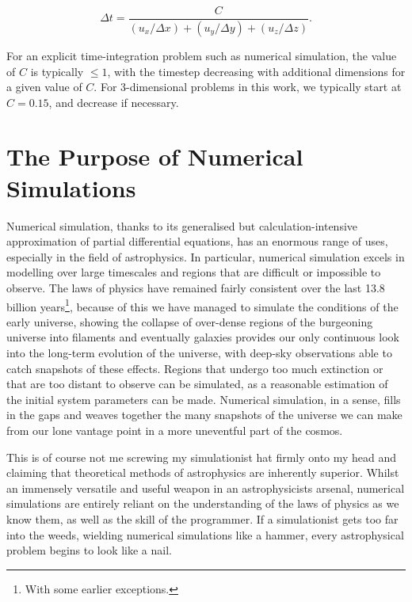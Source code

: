 \begin{equation}
  \Delta t = \frac{C}{(u_x/\Delta x) + (u_y/\Delta y) + (u_z/\Delta z)}.
\end{equation}

\noindent
For an explicit time-integration problem such as numerical simulation, the value of $C$ is typically $\leq 1$, with the timestep decreasing with additional dimensions for a given value of $C$.
For 3-dimensional problems in this work, we typically start at $C = 0.15$, and decrease if necessary.

\section{The Purpose of Numerical Simulations}
\label{sec:numerical-purpose}

Numerical simulation, thanks to its generalised but calculation-intensive approximation of partial differential equations, has an enormous range of uses, especially in the field of astrophysics.
In particular, numerical simulation excels in modelling over large timescales and regions that are difficult or impossible to observe.
The laws of physics have remained fairly consistent over the last 13.8 billion years\footnote{With some earlier exceptions.}, because of this we have managed to simulate the conditions of the early universe, showing the collapse of over-dense regions of the burgeoning universe into filaments and eventually galaxies provides our only continuous look into the long-term evolution of the universe, with deep-sky observations able to catch snapshots of these effects.
Regions that undergo too much extinction or that are too distant to observe can be simulated, as a reasonable estimation of the initial system parameters can be made.
Numerical simulation, in a sense, fills in the gaps and weaves together the many snapshots of the universe we can make from our lone vantage point in a more uneventful part of the cosmos.

This is of course not me screwing my simulationist hat firmly onto my head and claiming that theoretical methods of astrophysics are inherently superior.
Whilst an immensely versatile and useful weapon in an astrophysicists arsenal, numerical simulations are entirely reliant on the understanding of the laws of physics as we know them, as well as the skill of the programmer.
If a simulationist gets too far into the weeds, wielding numerical simulations like a hammer, every astrophysical problem begins to look like a nail.

